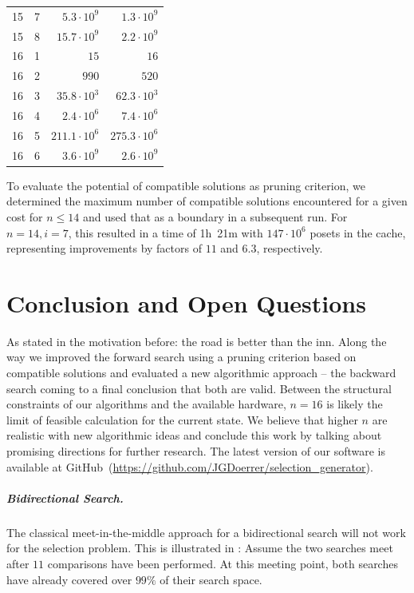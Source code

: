 \documentclass[a4paper,UKenglish,cleveref, autoref, thm-restate]{lipics-v2021}
\newcommand{\projectURL}[0]{https://github.com/JGDoerrer/selection_generator}
\newcommand{\projectServer}[0]{GitHub}
\begin{document}
\begin{table}[!t]
\begin{tabular}{c|c|r|r}
    15  & 7   & $5.3 \cdot 10^9$        & $1.3 \cdot 10^9$         \\
    15  & 8   & $15.7 \cdot 10^9$       & $2.2 \cdot 10^9$         \\
    \hline
    16  & 1   & $15$                    & $16$                     \\
    16  & 2   & $990$                   & $520$                    \\
    16  & 3   & $35.8 \cdot 10^3$       & $62.3 \cdot 10^3$        \\
    16  & 4   & $2.4 \cdot 10^6$        & $7.4 \cdot 10^6$         \\
    16  & 5   & $211.1 \cdot 10^6$      & $275.3 \cdot 10^6$       \\
    16  & 6   & $3.6 \cdot 10^9$        & $2.6 \cdot 10^9$         \\
  \end{tabular}
\end{table}

To evaluate the potential of compatible solutions as pruning criterion, we determined the maximum number of compatible solutions encountered for a given cost for $n \leq 14$ and used that as a boundary in a subsequent run.
For $n = 14, i = 7$, this resulted in a time of 1h~21m with $147 \cdot 10^6$ posets in the cache, representing improvements by factors of $11$ and $6.3$, respectively.


\section{Conclusion and Open Questions}


As stated in the motivation before: the road is better than the inn.
Along the way we improved the forward search using a pruning criterion based on compatible solutions and evaluated a new algorithmic approach -- the backward search coming to a final conclusion that both are valid.
Between the structural constraints of our algorithms and the available hardware, $n=16$ is likely the limit of feasible calculation for the current state.
We believe that higher $n$ are realistic with new algorithmic ideas and conclude this work by talking about promising directions for further research.
The latest version of our software is available at \projectServer~(\url{\projectURL}).

\subparagraph{Bidirectional Search.}
The classical meet-in-the-middle approach for a bidirectional search will not work for the selection problem.
This is illustrated in :
Assume the two searches meet after $11$ comparisons have been performed.
At this meeting point, both searches have already covered over $99\%$ of their search space.
\end{document}

